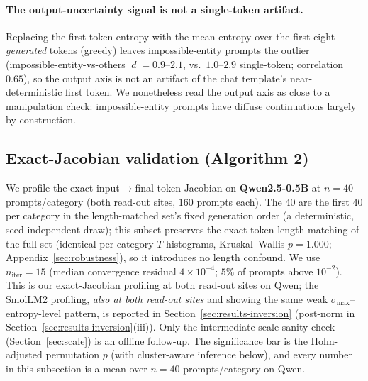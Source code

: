 \documentclass{article}
\begin{document}
\paragraph{The output-uncertainty signal is not a single-token artifact.}
Replacing the first-token entropy with the mean entropy over the first eight \emph{generated} tokens
(greedy) leaves impossible-entity prompts the outlier (impossible-entity-vs-others $|d|=0.9$--$2.1$, vs.\
$1.0$--$2.9$ single-token; correlation $0.65$), so the output axis is not an artifact of the chat
template's near-deterministic first token. We nonetheless read the output axis as close to a
manipulation check: impossible-entity prompts have diffuse continuations largely by construction.

\subsection{Exact-Jacobian validation (Algorithm 2)}
\label{sec:results-alg2}

We profile the exact input$\to$final-token Jacobian on \textbf{Qwen2.5-0.5B} at $n=40$
prompts/category (both read-out sites, $160$ prompts each). The $40$ are the first $40$ per category
in the length-matched set's fixed generation order (a deterministic, seed-independent draw); this
subset preserves the exact token-length matching of the full set (identical per-category $T$
histograms, Kruskal--Wallis $p=1.000$; Appendix~\ref{sec:robustness}), so it introduces no length
confound. We use $n_{\mathrm{iter}}=15$ (median
convergence residual $4\times10^{-4}$; $5\%$ of prompts above $10^{-2}$). This is our exact-Jacobian
profiling at both read-out sites on Qwen; the SmolLM2 profiling, \emph{also at both read-out sites}
and showing the same weak $\sigma_{\max}$--entropy-level pattern, is reported in
Section~\ref{sec:results-inversion} (post-norm in Section~\ref{sec:results-inversion}(iii)). Only the
intermediate-scale sanity check (Section~\ref{sec:scale}) is an offline follow-up. The
significance bar is the Holm-adjusted permutation $p$ (with cluster-aware inference below), and every
number in this subsection is a mean over $n=40$ prompts/category on Qwen.
\end{document}
